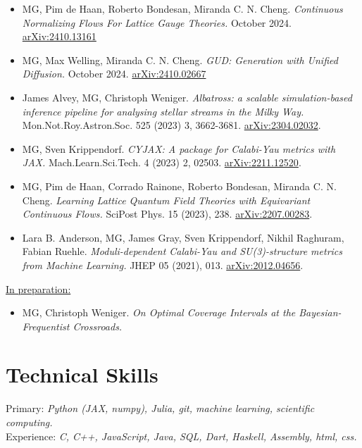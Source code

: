 \documentclass[11pt]{article}
\begin{document}
\begin{itemize}[left=0pt, itemsep=5pt]
    \item {MG}, Pim de Haan, Roberto Bondesan, Miranda C. N. Cheng. \textit{Continuous Normalizing Flows For Lattice Gauge Theories.} October 2024.  \href{https://arxiv.org/abs/2410.13161}{arXiv:2410.13161}

    \item {MG}, Max Welling, Miranda C. N. Cheng. \textit{GUD: Generation with Unified Diffusion.} October 2024. \href{https://arxiv.org/abs/2410.02667}{arXiv:2410.02667}

    \item James Alvey, {MG}, Christoph Weniger. \textit{Albatross: a scalable simulation-based inference pipeline for analysing stellar streams in the Milky Way.} Mon.Not.Roy.Astron.Soc. 525 (2023) 3, 3662-3681. \href{https://arxiv.org/abs/2304.02032}{arXiv:2304.02032}.

    \item {MG}, Sven Krippendorf. \textit{CYJAX: A package for Calabi-Yau metrics with JAX.} Mach.Learn.Sci.Tech. 4 (2023) 2, 02503. \href{https://arxiv.org/abs/2211.12520}{arXiv:2211.12520}.

    \item {MG}, Pim de Haan, Corrado Rainone, Roberto Bondesan, Miranda C. N. Cheng. \textit{Learning Lattice Quantum Field Theories with Equivariant Continuous Flows.} SciPost Phys. 15 (2023), 238. \href{https://arxiv.org/abs/2207.00283}{arXiv:2207.00283}.

    \item Lara B. Anderson, {MG}, James Gray, Sven Krippendorf, Nikhil Raghuram, Fabian Ruehle. \textit{Moduli-dependent Calabi-Yau and SU(3)-structure metrics from Machine Learning.} JHEP 05 (2021), 013. \href{https://arxiv.org/abs/2012.04656}{arXiv:2012.04656}.
\end{itemize}

\underline{In preparation:}

\begin{itemize}[left=0pt, itemsep=5pt]
    \item {MG}, Christoph Weniger. \textit{On Optimal Coverage Intervals at the Bayesian-Frequentist Crossroads.}
\end{itemize}


\section*{Technical Skills}
Primary: \textit{Python (JAX, numpy), Julia, git, machine learning, scientific computing.} \\
Experience: \textit{C, C++, JavaScript, Java, SQL, Dart, Haskell, Assembly, html, css.}
\end{document}
